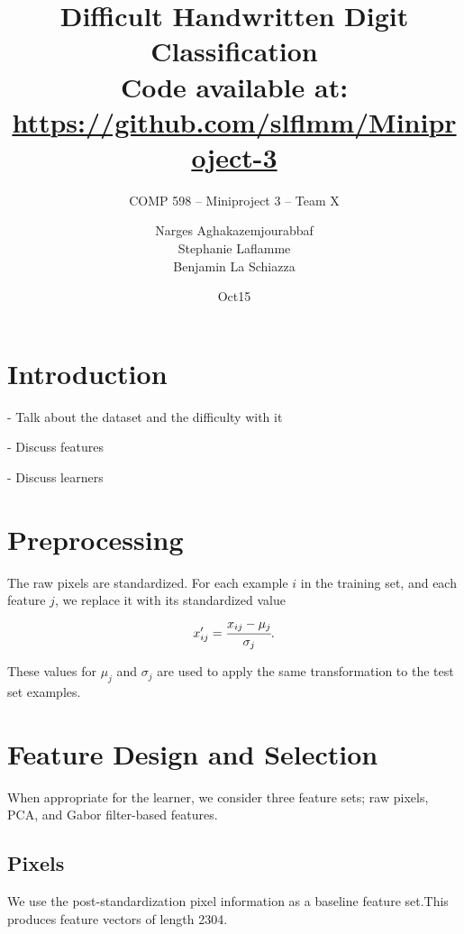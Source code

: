 \documentclass{acm_proc_article-sp}
\begin{document}
\title{Difficult Handwritten Digit Classification \\
{\normalsize Code available at: \url{https://github.com/slflmm/Miniproject-3}}} 
\subtitle{COMP 598 -- Miniproject 3 -- Team X}

\author{
\alignauthor 
Narges Aghakazemjourabbaf\\
\alignauthor
Stephanie Laflamme\\
\alignauthor Benjamin La Schiazza\\
}

\date{Oct15}



\maketitle
\begin{abstract}

\end{abstract}

\section{Introduction}%
- Talk about the dataset and the difficulty with it

- Discuss features

- Discuss learners

\section{Preprocessing}
The raw pixels are standardized. For each example $i$ in the training set, and each feature $j$, we replace it with its standardized value $$x'_{ij} = \cfrac{x_{ij} - \mu_{j}}{\sigma_{j}}.$$

These values for $\mu_j$ and $\sigma_j$ are used to apply the same transformation to the test set examples.

\section{Feature Design and Selection}
When appropriate for the learner, we consider three feature sets; raw pixels, PCA, and Gabor filter-based features.

\subsection{Pixels}
We use the post-standardization pixel information as a baseline feature set.This produces feature vectors of length 2304. 
\end{document}
